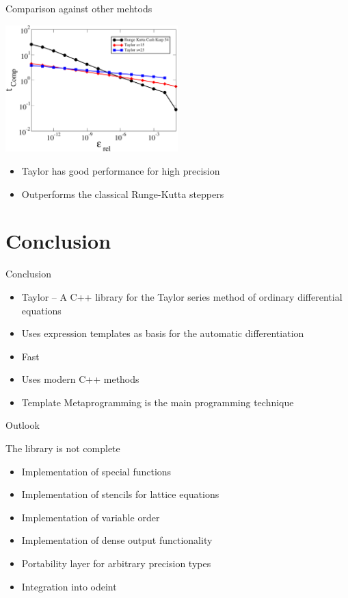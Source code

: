 \documentclass{beamer}
\begin{document}
\begin{frame}[fragile]{Comparison against other mehtods}

\centerline{
\includegraphics[draft=false,width=0.5\textwidth]{stepper_comp.pdf}
}

\begin{itemize}
 \item Taylor has good performance for high precision
 \item Outperforms the classical Runge-Kutta steppers
\end{itemize}


\end{frame}




\section{Conclusion}

\begin{frame}[fragile]{Conclusion}

  \begin{itemize}
    \item Taylor -- A C++ library for the Taylor series method of ordinary differential equations
    \item Uses expression templates as basis for the automatic differentiation
    \item Fast
    \item Uses modern C++ methods
    \item Template Metaprogramming is the main programming technique
  \end{itemize}

\end{frame}


\begin{frame}[fragile]{Outlook}

The library is not complete
\begin{itemize}
 \item Implementation of special functions
 \item Implementation of stencils for lattice equations
 \item Implementation of variable order
 \item Implementation of dense output functionality
 \item Portability layer for arbitrary precision types
 \item Integration into odeint
\end{itemize}

\end{frame}
\end{document}
